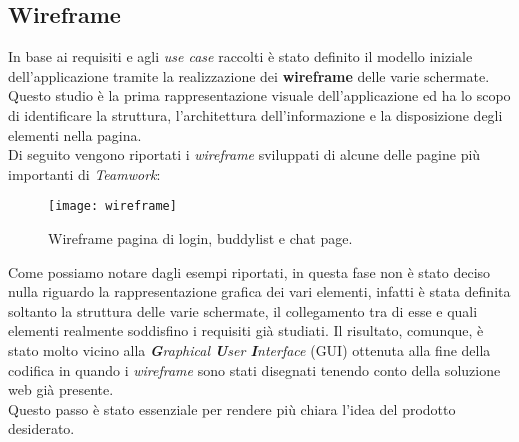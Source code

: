 \subsection{Wireframe}
In base ai requisiti e agli \emph{use case} raccolti è stato definito il modello iniziale
 dell'applicazione tramite la realizzazione dei \textbf{wireframe} delle varie schermate. \\
Questo studio è la prima rappresentazione visuale dell'applicazione ed ha lo 
scopo di identificare la struttura, l'architettura dell'informazione e la 
disposizione degli elementi nella pagina.\\
Di seguito vengono riportati i \emph{wireframe} sviluppati di alcune delle pagine più 
importanti di \emph{Teamwork}:
\begin{figure}[H] 
	\centering
	\texttt{[image: wireframe]}
	\caption{Wireframe pagina di login, buddylist e chat page.}
	\label{subsec:wireframe}
\end{figure}
Come possiamo notare dagli esempi riportati, in questa fase non è stato deciso 
nulla riguardo la rappresentazione grafica dei vari elementi, infatti 
è stata definita soltanto la struttura delle varie schermate, il collegamento
tra di esse e quali elementi realmente soddisfino i requisiti già studiati. 
Il risultato, comunque, è stato molto vicino alla \emph{\textbf{G}raphical \textbf{U}ser \textbf{I}nterface} (\acrshort{GUI}) ottenuta alla fine della 
codifica in quando i \emph{wireframe} sono stati disegnati tenendo conto della 
soluzione web già presente.\\ 
Questo passo è stato essenziale per rendere più chiara l'idea del prodotto desiderato.

